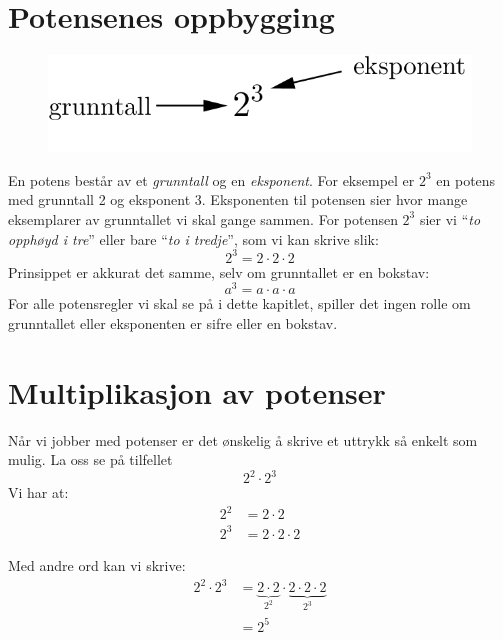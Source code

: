 



\section{Potensenes oppbygging}
\begin{figure}[hbt]
\centering \includegraphics{pot} 
\end{figure}\vs
En potens består av et \textit{grunntall} og en \textit{eksponent}. For eksempel er $2^{3}$ en potens med grunntall 2 og
eksponent 3. Eksponenten til potensen sier hvor mange eksemplarer
av grunntallet vi skal gange sammen. For potensen $2^{3}$ sier vi
``\textit{to opphøyd i tre}'' eller bare ``\textit{to i tredje}'',
som vi kan skrive slik: 
\[
2^{3}=2\cdot2\cdot2
\]
Prinsippet er akkurat det samme, selv om grunntallet er en bokstav:
\[
a^{3}=a\cdot a\cdot a
\]
For alle potensregler vi skal se på i dette kapitlet, spiller det ingen rolle om grunntallet eller eksponenten er sifre eller en bokstav.\regv
{}
\eks[2]{\vs \vs
	\[ c^4 = c\cdot c \cdot c \cdot c \]
}
\section{Multiplikasjon av potenser}
Når vi jobber med potenser er det ønskelig å skrive et uttrykk så enkelt som mulig. La oss se på tilfellet 
\[ 2^{2}\cdot2^{3} \]
Vi har at: \vs
\begin{align*}
2^{2} & =2\cdot2\\
2^{3} & =2\cdot2\cdot2
\end{align*}


Med andre ord kan vi skrive: 
\begin{align*}
2^{2}\cdot2^{3} & =\underbrace{2\cdot2}_{2^{2}}\cdot\underbrace{2\cdot2\cdot2}_{2^{3}}\\
 & =2^{5}
\end{align*}
